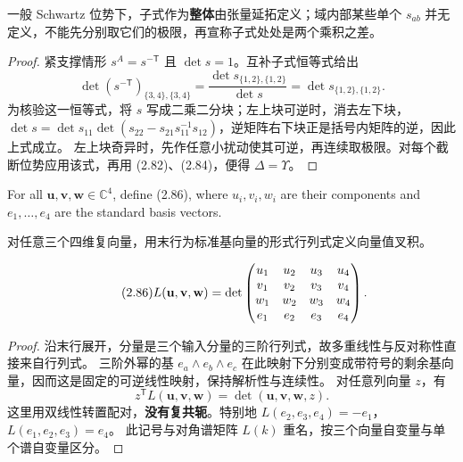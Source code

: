 \begin{note}
一般 Schwartz 位势下，子式作为\textbf{整体}由张量延拓定义；域内部某些单个 $s_{ab}$ 并无定义，不能先分别取它们的极限，再宣称子式处处是两个乘积之差。
\end{note}
\begin{proof}
紧支撑情形 $s^A=s^{-\mathsf T}$ 且 $\det s=1$。互补子式恒等式给出
\[
\det(s^{-\mathsf T})_{\{3,4\},\{3,4\}}
=\dfrac{\det s_{\{1,2\},\{1,2\}}}{\det s}
=\det s_{\{1,2\},\{1,2\}}.
\]
为核验这一恒等式，将 $s$ 写成二乘二分块；左上块可逆时，消去左下块，$\det s=\det s_{11}\det(s_{22}-s_{21}s_{11}^{-1}s_{12})$，逆矩阵右下块正是括号内矩阵的逆，因此上式成立。
左上块奇异时，先作任意小扰动使其可逆，再连续取极限。对每个截断位势应用该式，再用 (2.82)、(2.84)，便得 $\Delta=\Upsilon$。
\end{proof}
\begin{paperdefinitionen}
For all $\mathbf u,\mathbf v,\mathbf w\in\mathbb C^4$, define (2.86), where $u_i,v_i,w_i$ are their components and $e_1,\ldots,e_4$ are the standard basis vectors.
\end{paperdefinitionen}
\begin{paperdefinitioncn*}[广义叉积]
对任意三个四维复向量，用末行为标准基向量的形式行列式定义向量值叉积。
\end{paperdefinitioncn*}
\begin{equation}\originaleq{2.86}
L(\mathbf u,\mathbf v,\mathbf w)=\det\begin{pmatrix}u_1&u_2&u_3&u_4\\v_1&v_2&v_3&v_4\\w_1&w_2&w_3&w_4\\e_1&e_2&e_3&e_4\end{pmatrix}.
\end{equation}
\begin{proof}
沿末行展开，分量是三个输入分量的三阶行列式，故多重线性与反对称性直接来自行列式。
三阶外幂的基 $e_a\wedge e_b\wedge e_c$ 在此映射下分别变成带符号的剩余基向量，因而这是固定的可逆线性映射，保持解析性与连续性。
对任意列向量 $z$，有
\[
z^{\mathsf T}L(\mathbf u,\mathbf v,\mathbf w)=\det(\mathbf u,\mathbf v,\mathbf w,z).
\]
这里用双线性转置配对，\textbf{没有复共轭}。特别地 $L(e_2,e_3,e_4)=-e_1$，$L(e_1,e_2,e_3)=e_4$。
此记号与对角谱矩阵 $L(k)$ 重名，按三个向量自变量与单个谱自变量区分。
\end{proof}
